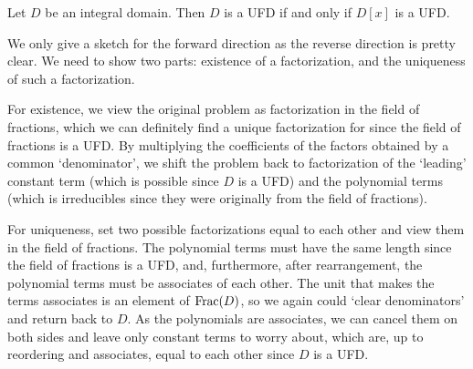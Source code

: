\begin{theorem}\label{thrm-UFD-iff-polynomial-ring-is-UFD}
    Let $D$ be an integral domain. Then $D$ is a UFD if and only if $D[x]$ is a UFD.
\end{theorem}
\begin{proofsketch}
    We only give a sketch for the forward direction as the reverse direction is pretty clear. We need to show two parts: existence of a factorization, and the uniqueness of such a factorization.

    For existence, we view the original problem as factorization in the field of fractions, which we can definitely find a unique factorization for since the field of fractions is a UFD. By multiplying the coefficients of the factors obtained by a common `denominator', we shift the problem back to factorization of the `leading' constant term (which is possible since $D$ is a UFD) and the polynomial terms (which is irreducibles since they were originally from the field of fractions).

    For uniqueness, set two possible factorizations equal to each other and view them in the field of fractions. The polynomial terms must have the same length since the field of fractions is a UFD, and, furthermore, after rearrangement, the polynomial terms must be associates of each other. The unit that makes the terms associates is an element of $\mathrm{Frac}(D)$, so we again could `clear denominators' and return back to $D$. As the polynomials are associates, we can cancel them on both sides and leave only constant terms to worry about, which are, up to reordering and associates, equal to each other since $D$ is a UFD.
\end{proofsketch}
